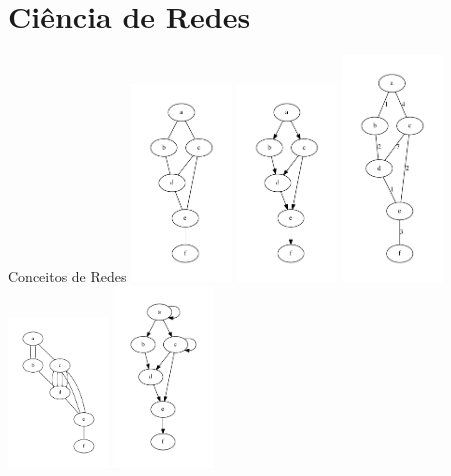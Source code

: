 \documentclass[10pt, hyperref={pdfpagelabels=false}]{beamer}
\begin{document}
\section{Ciência de Redes}

{
\begin{frame}[label=conceitos-basicos]{Conceitos de Redes}
  \includegraphics[width=0.2\textwidth]{simple.pdf}
  \includegraphics[width=0.2\textwidth]{directed.pdf}
  \includegraphics[width=0.2\textwidth]{weighted.pdf}
  \includegraphics[width=0.2\textwidth]{multiple.pdf}
  \includegraphics[width=0.2\textwidth]{loop.pdf}
\end{frame}
}
\end{document}
